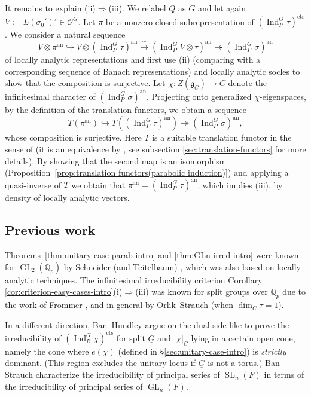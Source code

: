 \documentclass[a4paper]{amsart}
\numberwithin{equation}{section}
\theoremstyle{remark}
\theoremstyle{definition}
\DeclareMathOperator{\Ind}{Ind}
\newcommand{\Q}{\mathbb{Q}}
\DeclareMathOperator{\SL}{SL}
\DeclareMathOperator{\GL}{GL}
\newcommand{\alggrp}[1]{\underline{#1}}
\newcommand{\an}{\mathrm{an}}
\newcommand{\cts}{\mathrm{cts}}
\newcommand{\congto}{\xrightarrow{\,\sim\,}}
\newcommand{\into}{\hookrightarrow}
\newcommand{\onto}{\twoheadrightarrow}
\begin{document}
It remains to explain (ii)$\Rightarrow$(iii).
We relabel $Q$ as $G$ and let again $V := \underline L(\sigma_0')' \in \mathcal O^G$.
Let $\pi$ be a nonzero closed subrepresentation of $(\Ind_P^G \tau)^\cts$.
We consider a natural sequence
\begin{equation*}
  V \otimes \pi^\an \into V \otimes (\Ind_P^G \tau)^\an \congto (\Ind_P^G V \otimes \tau)^\an \onto (\Ind_P^G \sigma)^\an
\end{equation*}
of locally analytic representations and first use (ii) (comparing with a corresponding sequence of Banach representations) and locally analytic socles to show that the composition is surjective.
Let $\chi \colon Z(\mathfrak g_C) \to C$ denote the infinitesimal character of $(\Ind_P^G \sigma)^\an$.
Projecting onto generalized $\chi$-eigenspaces, by the definition of the translation functors, we obtain a sequence
\begin{equation*}
  T(\pi^\an) \into T((\Ind_P^G \tau)^\an) \onto (\Ind_P^G \sigma)^\an,
\end{equation*}
whose composition is surjective. Here $T$ is a suitable translation functor in the sense of \cite{MR581584} (it is an equivalence by \cite{MR581584}, see subsection \ref{sec:translation-functors} for more details).
By showing that the second map is an isomorphism (Proposition~\ref{prop:translation functors(parabolic induction)}) and applying a quasi-inverse of $T$ we obtain that $\pi^\an = (\Ind_P^G \tau)^\an$, which implies (iii), by density of locally analytic vectors.

\subsection{Previous work}
Theorems~\ref{thm:unitary case-parab-intro} and \ref{thm:GLn-irred-intro} were known for $\GL_2(\Q_p)$ by Schneider (and Teitelbaum) \cite[Proposition 2.6(i)]{MR2275644}, which was also based on locally analytic techniques.
The infinitesimal irreducibility criterion Corollary \ref{cor:criterion-easy-cases-intro}(i)$\Rightarrow$(iii) was known for split groups over $\Q_p$ due to the work of Frommer \cite{frommer}, \cite[Proposition 2.6(ii)]{MR2275644} and in general by Orlik--Strauch \cite{OS} (when $\dim_C \tau = 1$).

In a different direction, Ban--Hundley \cite{MR3537231} argue on the dual side like \cite{MR1900706} to prove the irreducibility of $(\Ind_B^G \chi)^\cts$ for split $\alggrp G$ and $\lvert\chi\rvert_C$ lying in a certain open cone, namely the cone where $e(\chi)$ (defined in \S\ref{sec:unitary-case-intro}) is \emph{strictly} dominant. 
(This region excludes the unitary locus if $\alggrp G$ is not a torus.)
Ban--Strauch \cite{arxiv.1912.11125} characterize the irreducibility of principal series of $\SL_n(F)$ in terms of the irreducibility of principal series of $\GL_n(F)$.
\end{document}
